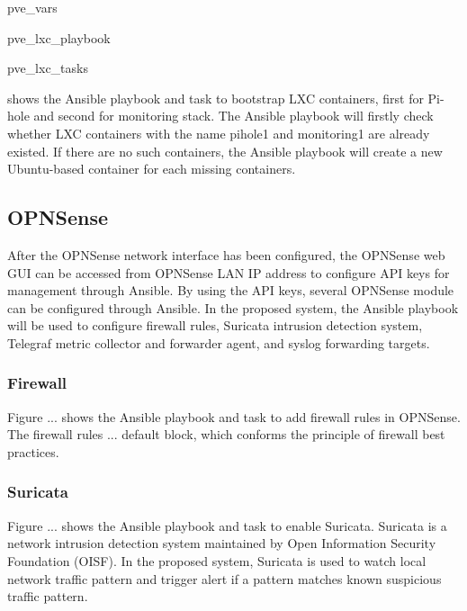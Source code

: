 \documentclass[../index.tex]{subfiles}
\begin{document}
{pve_vars}

{pve_lxc_playbook}

{pve_lxc_tasks}

 shows the Ansible playbook and task to
bootstrap LXC containers, first for Pi-hole and second for monitoring stack. The Ansible playbook
will firstly check whether LXC containers with the name pihole1 and monitoring1 are already existed.
If there are no such containers, the Ansible playbook will create a new Ubuntu-based container for
each missing containers.

\subsection{OPNSense}

After the OPNSense network interface has been configured, the OPNSense web GUI can be accessed from
OPNSense LAN IP address to configure API keys for management through Ansible. By using the API keys,
several OPNSense module can be configured through Ansible. In the proposed system, the Ansible
playbook will be used to configure firewall rules, Suricata intrusion detection system, Telegraf
metric collector and forwarder agent, and syslog forwarding targets. 

\subsubsection{Firewall}

Figure ... shows the Ansible playbook and task to add firewall rules in OPNSense. The firewall rules
... default block, which conforms the principle of firewall best practices.

\subsubsection{Suricata}

Figure ... shows the Ansible playbook and task to enable Suricata. Suricata is a network intrusion
detection system maintained by Open Information Security Foundation (OISF). In the proposed system,
Suricata is used to watch local network traffic pattern and trigger alert if a pattern matches known
suspicious traffic pattern.
\end{document}
